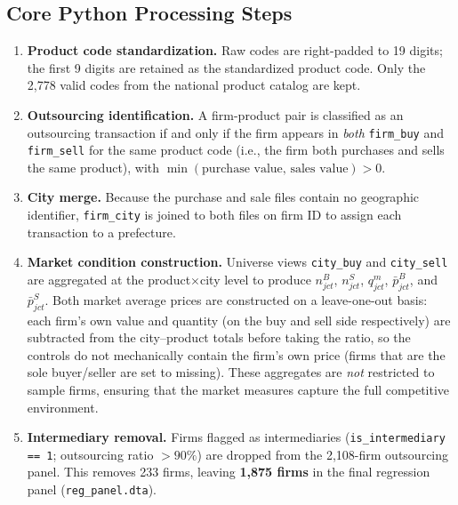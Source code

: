 \documentclass[12pt]{article}
\begin{document}
\subsection*{Core Python Processing Steps}

\begin{enumerate}[leftmargin=1.8em, label=\arabic*.]

  \item \textbf{Product code standardization.}
    Raw codes are right-padded to 19 digits; the first 9 digits are retained as
    the standardized product code. Only the 2,778 valid codes from the national
    product catalog are kept.

  \item \textbf{Outsourcing identification.}
    A firm-product pair is classified as an outsourcing transaction if and only
    if the firm appears in \emph{both} \texttt{firm\_buy} and
    \texttt{firm\_sell} for the same product code (i.e., the firm both purchases
    and sells the same product), with
    \(\min(\text{purchase value},\, \text{sales value}) > 0\).

  \item \textbf{City merge.}
    Because the purchase and sale files contain no geographic identifier,
    \texttt{firm\_city} is joined to both files on firm ID to assign each
    transaction to a prefecture.

  \item \textbf{Market condition construction.}
    Universe views \texttt{city\_buy} and \texttt{city\_sell} are aggregated at
    the product\(\times\)city level to produce \(n^{B}_{jct}\),
    \(n^{S}_{jct}\), \(q^{m}_{jct}\), \(\bar{p}^{B}_{jct}\), and
    \(\bar{p}^{S}_{jct}\). Both market average prices are constructed on a
    leave-one-out basis: each firm's own value and quantity (on the buy and sell
    side respectively) are subtracted from the city--product totals before
    taking the ratio, so the controls do not mechanically contain the firm's own
    price (firms that are the sole buyer/seller are set to missing).
    These aggregates are \emph{not} restricted to sample firms, ensuring that
    the market measures capture the full competitive environment.

  \item \textbf{Intermediary removal.}
    Firms flagged as intermediaries (\texttt{is\_intermediary == 1};
    outsourcing ratio \(>90\%\)) are dropped from the 2,108-firm outsourcing
    panel. This removes 233 firms, leaving \textbf{1,875 firms} in the final
    regression panel (\texttt{reg\_panel.dta}).

\end{enumerate}
\end{document}
